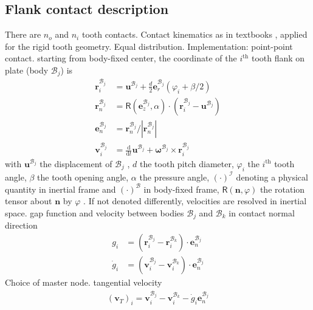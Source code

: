 \documentclass[a4paper,fleqn]{cas-dc}
\begin{document}
\subsection{Flank contact description}
There are $n_o$ and $n_i$ tooth contacts. Contact kinematics as in textbooks \cite{willner2013kontinuums}, applied for the rigid tooth geometry. 
Equal distribution. Implementation: point-point contact. 
starting from body-fixed center, the coordinate of the $i^{\textrm{th}}$ tooth flank on plate (body $\mathcal{B}_j$) is
\begin{align}
	\mathbf{r}_{i}^{\mathcal{B}_j} & = \mathbf{u}^{\mathcal{B}_j} + \frac{d}{2} \mathbf{e}_r^{\mathcal{B}_j} \left(\varphi_i+\beta/2\right) \\
	\mathbf{r}_{n}^{\mathcal{B}_j} & = \mathsf{R}(\mathbf{e}_z^{\mathcal{B}_j},\alpha)\cdot \left(\mathbf{r}_{i}^{\mathcal{B}_j}-\mathbf{u}^{\mathcal{B}_j}\right)\\
	\mathbf{e}_{n}^{\mathcal{B}_j}& = \mathbf{r}_{n}^{\mathcal{B}_j}\big/ |\mathbf{r}_{n}^{\mathcal{B}_j}|\\
	\mathbf{v}_i^{\mathcal{B}_j} & = \frac{\textrm{d}}{\textrm{d}t}\mathbf{u}^{\mathcal{B}_j} + \mathbf{\omega}^{\mathcal{B}_j}\times \mathbf{r}_i^{\mathcal{B}_j}
\end{align}
with $\boldsymbol{u}^{\mathcal{B}_j}$ the displacement of $\mathcal{B}_j$ , $d$ the tooth pitch diameter, $\varphi_i$ the $i^{\textrm{th}}$ tooth angle, $\beta$ the tooth opening angle, $\alpha$ the pressure angle, $(\cdot)^\mathcal{I}$ denoting a physical quantity in inertial frame and $(\cdot)^\mathcal{B}$ in body-fixed frame, $\mathsf{R}(\mathbf{n},\varphi)$ the rotation tensor about $\mathbf{n}$ by $\varphi$ \cite{wittenburg2016kinematics}. If not denoted differently, velocities are resolved in inertial space. gap function and velocity between bodies $\mathcal{B}_j$ and $\mathcal{B}_k$ in contact normal direction
\begin{align}
	g_i & = \left(\textbf{r}_i^{\mathcal{B}_j}-\textbf{r}_i^{\mathcal{B}_k}\right)\cdot \textbf{e}_{n}^{\mathcal{B}_j}\\
	\dot g_i & = \left(\textbf{v}_i^{\mathcal{B}_j}-\textbf{v}_i^{\mathcal{B}_k}\right)\cdot \textbf{e}_{n}^{\mathcal{B}_j}
\end{align}
Choice of master node. tangential velocity
\begin{align}
	\left(\mathbf{v}_T\right)_i = \textbf{v}_i^{\mathcal{B}_j}-\textbf{v}_i^{\mathcal{B}_k}-\dot {g}_i\mathbf{e}_n^{\mathcal B_j}
\end{align}
\end{document}
